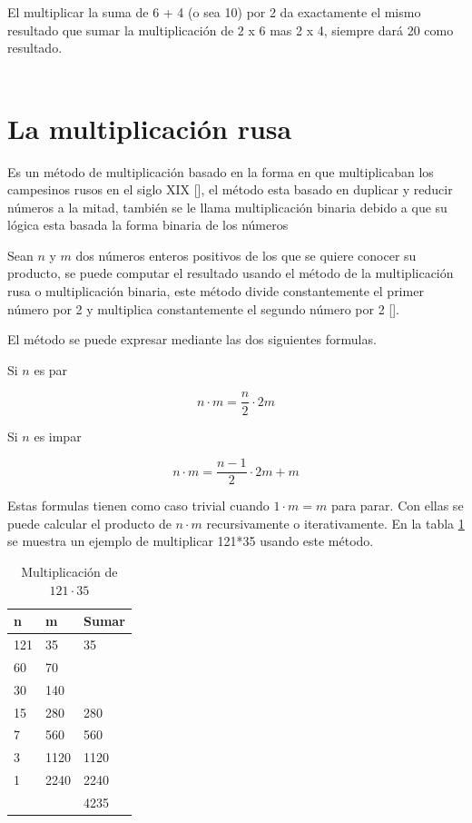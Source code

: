 \documentclass[10pt,journal,compsoc]{IEEEtran}
\begin{document}
El multiplicar la suma de 6 + 4 (o sea 10) por 2 da exactamente el mismo resultado que sumar la multiplicación de 2 x 6 mas 2 x 4, siempre dará 20 como resultado.
\\\\

\section{La multiplicación rusa}

Es un método de multiplicación basado en la forma en que multiplicaban los campesinos rusos en el siglo XIX [\cite{DP06}], el método esta basado en duplicar  y reducir números a la mitad, también se le llama multiplicación binaria debido a que su lógica esta basada la forma binaria de los números

Sean $n$ y $m$ dos números enteros positivos de los que se quiere conocer su producto, se puede computar el resultado usando el método de la multiplicación rusa o multiplicación binaria, este método divide constantemente el primer número por 2 y multiplica constantemente el segundo número por 2 [\cite{AL14}].

	El método se puede expresar mediante las dos siguientes formulas.

Si $n$ es par

$$ n \cdot m  = \dfrac{n}{2} \cdot 2m $$

Si $n$ es impar

$$ n \cdot m  = \dfrac{n-1}{2} \cdot 2m + m$$

Estas formulas tienen como caso trivial cuando $1 \cdot m = m$ para parar. Con ellas se puede calcular el producto de $n \cdot m$ recursivamente o iterativamente. En la tabla \ref{tab:eje1} se muestra un ejemplo de multiplicar 121*35 usando este método.

\begin{table}[!h]
\centering
\label{tab:eje1}
\begin{tabular}{ll|l}
n   & m    & Sumar \\ \hline
121 & 35   & 35    \\
60  & 70   &       \\
30  & 140  &       \\
15  & 280  & 280   \\
7   & 560  & 560   \\
3   & 1120 & 1120  \\
1   & 2240 & 2240  \\ \hline
    &      & 4235
\end{tabular}
\caption{Multiplicación de $121\cdot 35$}
\end{table}
\end{document}
